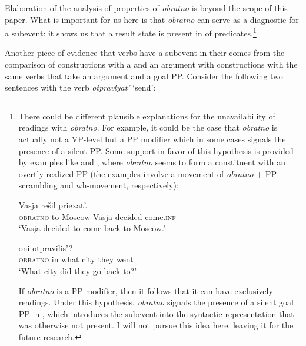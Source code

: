 \documentclass[output=paper]{langscibook}
\begin{document}
\noindent Elaboration of the analysis of properties of  \textit{obratno} is beyond the scope of this paper. What is important for us here is that \textit{obratno} can serve as a diagnostic for a  subevent: it shows us that a result state is present in  of  predicates.\footnote{There
  could be different plausible explanations for the unavailability of  readings with \textit{obratno}. For example, it could be the case that \textit{obratno} is actually not a VP-level  but a PP modifier which in some cases signals the presence of a silent PP. Some support in favor of this hypothesis is provided by examples like  and , where \textit{obratno} seems to form a constituent with an overtly realized PP (the examples involve a movement of \textit{obratno} + PP -- scrambling and wh-movement, respectively):

  \ea\label{ex:bondarenko:fn9i}
   Vasja rešil priexat’.\\
  {} \textsc{obratno} to Moscow Vasja decided come.\textsc{inf}\\
  \glt `Vasja decided to come back to Moscow.'
  \z

  \ea\label{ex:bondarenko:fn9ii}
     oni otpravilis’?\\
    {} \textsc{obratno} in what city they went\\
    \glt `What city did they go back to?'
    \z
    
    \noindent If \textit{obratno} is a PP modifier, then it follows that it can have exclusively  readings. Under this hypothesis, \textit{obratno} signals the presence of a silent goal PP in , which introduces the  subevent into the syntactic representation that was otherwise not present. I will not pursue this idea here, leaving it for the future research.
    }

Another piece of evidence that   verbs have a  sub\-event in their  comes from the comparison of  constructions with a  and an  argument with constructions with the same verbs that take an  argument and a goal PP. Consider the following two sentences with the verb \textit{otpravlyat’} ‘send’:
\end{document}
